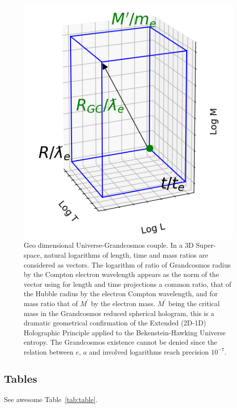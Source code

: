 \documentclass{article}
\begin{document}
\begin{figure}
  \centering
  \fbox{\rule[-.5cm]{4cm}{4cm} \rule[-.5cm]{4cm}{0cm}}
  \includegraphics{./figures/triaxis.png}
  \caption{Geo dimensional Universe-Grandcosmos couple. In a 3D Super-space, natural logarithms of length, time and mass ratios are considered as vectors. The logarithm of ratio of Grandcosmos radius by the Compton electron wavelength appears as the norm of the vector using for length and time projections a common ratio, that of the Hubble radius by the electron Compton wavelength, and for mass ratio that of $M^{\prime}$ by the electron mass. $M^{\prime}$ being the critical mass in the Grandcosmos reduced spherical hologram, this is a dramatic geometrical confirmation of the Extended (2D-1D) Holographic Principle applied to the Bekenstein-Hawking Universe entropy. The Grandcosmos existence cannot be denied since the relation between $e$, $a$ and involved logarithms reach precision $10^{-7}$.}
\end{figure}

\subsection{Tables}
\lipsum[12]
See awesome Table~\ref{tab:table}.
\end{document}
